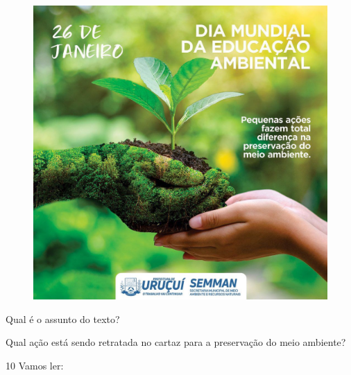\begin{figure}[H]
\centering
\includegraphics[width=.8\textwidth]{media/image123.jpeg}
\end{figure}


\begin{escolha}
\item Qual é o assunto do texto?


\item Qual ação está sendo retratada no cartaz para a preservação do meio ambiente?

\end{escolha}

\num{10} Vamos ler:

